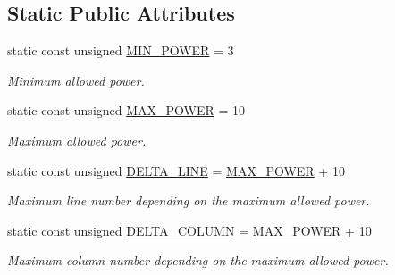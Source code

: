 \subsection*{Static Public Attributes}
\begin{DoxyCompactItemize}
\item 
\hypertarget{classConnectN_a0098050ba1e1691aa2bab3eeacd127be}{static const unsigned \hyperlink{classConnectN_a0098050ba1e1691aa2bab3eeacd127be}{M\+I\+N\+\_\+\+P\+O\+W\+E\+R} = 3}\label{classConnectN_a0098050ba1e1691aa2bab3eeacd127be}

\begin{DoxyCompactList}\small\item\em Minimum allowed power. \end{DoxyCompactList}\item 
\hypertarget{classConnectN_a785bea2a4b4bf7b12d5611afc309096b}{static const unsigned \hyperlink{classConnectN_a785bea2a4b4bf7b12d5611afc309096b}{M\+A\+X\+\_\+\+P\+O\+W\+E\+R} = 10}\label{classConnectN_a785bea2a4b4bf7b12d5611afc309096b}

\begin{DoxyCompactList}\small\item\em Maximum allowed power. \end{DoxyCompactList}\item 
\hypertarget{classConnectN_aba6b11a59052663b23cb2a9611d25d2f}{static const unsigned \hyperlink{classConnectN_aba6b11a59052663b23cb2a9611d25d2f}{D\+E\+L\+T\+A\+\_\+\+L\+I\+N\+E} = \hyperlink{classConnectN_a785bea2a4b4bf7b12d5611afc309096b}{M\+A\+X\+\_\+\+P\+O\+W\+E\+R} + 10}\label{classConnectN_aba6b11a59052663b23cb2a9611d25d2f}

\begin{DoxyCompactList}\small\item\em Maximum line number depending on the maximum allowed power. \end{DoxyCompactList}\item 
\hypertarget{classConnectN_a111b3987f792f8dca47d857f3f88ba61}{static const unsigned \hyperlink{classConnectN_a111b3987f792f8dca47d857f3f88ba61}{D\+E\+L\+T\+A\+\_\+\+C\+O\+L\+U\+M\+N} = \hyperlink{classConnectN_a785bea2a4b4bf7b12d5611afc309096b}{M\+A\+X\+\_\+\+P\+O\+W\+E\+R} + 10}\label{classConnectN_a111b3987f792f8dca47d857f3f88ba61}

\begin{DoxyCompactList}\small\item\em Maximum column number depending on the maximum allowed power. \end{DoxyCompactList}\end{DoxyCompactItemize}


